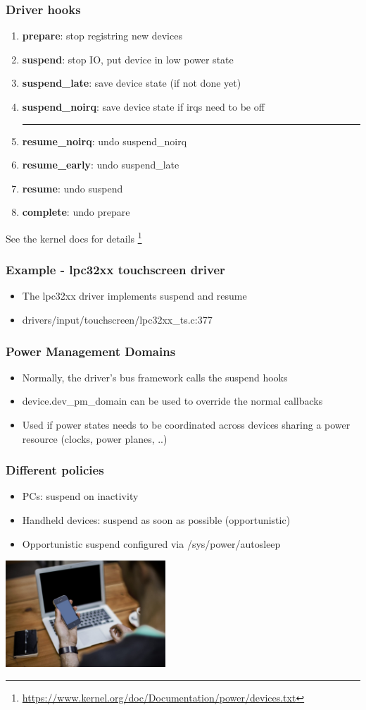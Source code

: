 \documentclass{beamer}
\begin{document}
\begin{frame}
\frametitle{Driver hooks}
\begin{enumerate}
	\item \textbf{prepare}: stop registring new devices
	\item \textbf{suspend}: stop IO, put device in low power state
	\item \textbf{suspend\_late}: save device state (if not done yet)
	\item \textbf{suspend\_noirq}: save device state if irqs need to be off
\noindent\rule{4cm}{0.4pt}
	\item \textbf{resume\_noirq}: undo suspend\_noirq
	\item \textbf{resume\_early}: undo suspend\_late
	\item \textbf{resume}: undo suspend
	\item \textbf{complete}: undo prepare
\end{enumerate}
See the kernel docs for details \footnote{\url{https://www.kernel.org/doc/Documentation/power/devices.txt}}
\end{frame}

\begin{frame}
\frametitle{Example - lpc32xx touchscreen driver}
\begin{itemize}
	\item The lpc32xx driver implements suspend and resume
	\item drivers/input/touchscreen/lpc32xx\_ts.c:377
\end{itemize}
\end{frame}


\begin{frame}
\frametitle{Power Management Domains}
\begin{itemize}
	\item Normally, the driver's bus framework calls the suspend hooks
	\item device.dev\_pm\_domain can be used to override the normal callbacks
	\item Used if power states needs to be coordinated across devices sharing a power resource (clocks, power planes, ..)
\end{itemize}
\end{frame}

\begin{frame}
\frametitle{Different policies}
\begin{itemize}
	\item PCs: suspend on inactivity 
	\item Handheld devices: suspend as soon as possible (opportunistic)
	\item Opportunistic suspend configured via /sys/power/autosleep
\end{itemize}
\includegraphics[width=6cm]{media/pchandheld.jpg}
\end{frame}
\end{document}
